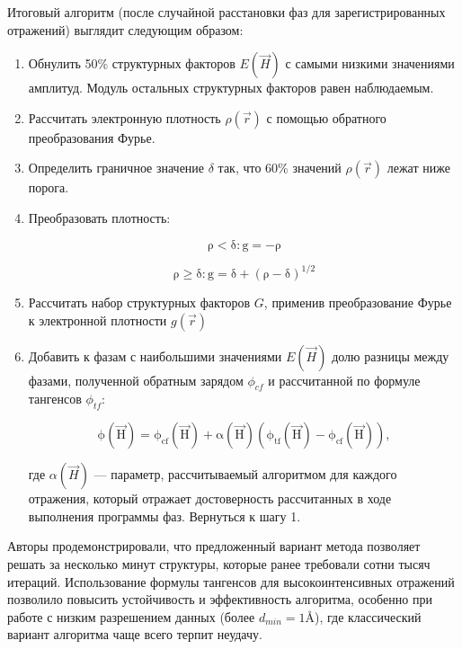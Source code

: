 Итоговый алгоритм (после случайной расстановки фаз для зарегистрированных отражений) выглядит следующим образом:

\begin{enumerate}
	\item Обнулить 50\% структурных факторов $E(\overrightarrow{H})$ с самыми низкими значениями амплитуд. Модуль остальных структурных факторов равен наблюдаемым.
	\item Рассчитать электронную плотность $\rho(\overrightarrow{r})$ с помощью обратного преобразования Фурье.
	\item Определить граничное значение $\delta$ так, что 60\% значений $\rho(\overrightarrow{r})$ лежат ниже порога.
	\item Преобразовать плотность:
	
	\begin{equation}
		\mathrm{\rho<\delta: g = -\rho}
	\end{equation}
	 
	\begin{equation}
		\mathrm{\rho\geq\delta: g = \delta + (\rho-\delta)^{1/2}}
	\end{equation}

	\item Рассчитать набор структурных факторов $G$, применив преобразование Фурье к электронной плотности $g(\overrightarrow{r})$
	\item Добавить к фазам с наибольшими значениями $E(\overrightarrow{H})$ долю разницы между фазами, полученной обратным зарядом $\phi_{cf}$ и рассчитанной по формуле тангенсов $\phi_{tf}$:
	
	\begin{equation}
		\mathrm{\phi(\overrightarrow{H}) = \phi_{cf}(\overrightarrow{H})+\alpha(\overrightarrow{H})(\phi_{tf}(\overrightarrow{H})-\phi_{cf}(\overrightarrow{H})),}
	\end{equation}
	 
	 где $\alpha(\overrightarrow{H})$ --- параметр, рассчитываемый алгоритмом для каждого отражения, который отражает достоверность рассчитанных в ходе выполнения программы фаз. Вернуться к шагу 1.
\end{enumerate}

Авторы продемонстрировали, что предложенный вариант метода позволяет решать за несколько минут структуры, которые ранее требовали сотни тысяч итераций. Использование формулы тангенсов для высокоинтенсивных отражений позволило повысить устойчивость и эффективность алгоритма, особенно при работе с низким разрешением данных (более $d_{min} = 1 \text{\AA}$), где классический вариант алгоритма чаще всего терпит неудачу.

